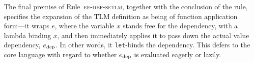 \documentclass[acmsmall,screen]{acmart}
\newcommand{\li}[1]{\lstinline[basicstyle=\ttfamily\fontsize{9pt}{1em}\selectfont]{#1}}
\begin{document}
The final premise of Rule~\textsc{ee-def-setlm}, together with the conclusion of the rule, specifies the expansion of the TLM definition as being of function application form---it wraps $e$, where the variable $x$ stands free for the dependency, with a lambda binding $x$, and then immediately applies it to pass down the actual value dependency, $e_\text{dep}$. In other words, it \li{let}-binds the dependency. This defers to the core language with regard to whether $e_\text{dep}$ is evaluated eagerly or lazily.








\end{document}
